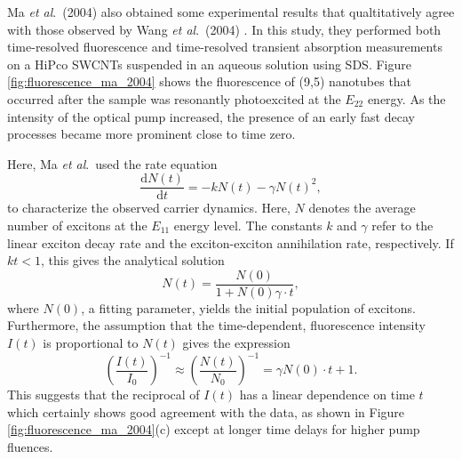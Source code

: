 Ma \textit{et al}.\ (2004) also obtained some experimental results that qualtitatively agree with those observed by Wang \textit{et al}.\ (2004) \cite{wang2004observation}. In this study, they performed both time-resolved fluorescence and time-resolved transient absorption measurements on a HiPco SWCNTs suspended in an aqueous solution using SDS. Figure \ref{fig:fluorescence_ma_2004} shows the fluorescence of (9,5) nanotubes that occurred after the sample was resonantly photoexcited at the $E_{22}$ energy. As the intensity of the optical pump increased, the presence of an early fast decay processes became more prominent close to time zero.

Here, Ma \textit{et al}.\ used the rate equation
\begin{equation}
	\dfrac{\mathrm{d}N(t)}{\mathrm{d}t} = - k N(t) - \gamma N(t)^2,
\end{equation}
to characterize the observed carrier dynamics. Here, $N$ denotes the average number of excitons at the $E_{11}$ energy level. The constants $k$ and $\gamma$ refer to the linear exciton decay rate and the exciton-exciton annihilation rate, respectively. If $kt < 1$, this gives the analytical solution
\begin{equation}
	N(t) = \dfrac{N(0)}{1 + N(0)\gamma \cdot t},
\end{equation}
where $N(0)$, a fitting parameter, yields the initial population of excitons. Furthermore, the assumption that the time-dependent, fluorescence intensity $I(t)$ is proportional to $ N(t)$ gives the expression
\begin{equation}
  	\left( \dfrac{I(t)}{I_0} \right)^{-1} \approx \left( \dfrac{N(t)}{N_0} \right)^{-1} = \gamma N(0) \cdot t + 1.
\end{equation}
This suggests that the reciprocal of $I(t)$ has a linear dependence on time $t$ which certainly shows good agreement with the data, as shown in Figure \ref{fig:fluorescence_ma_2004}(c) except at longer time delays for higher pump fluences.

